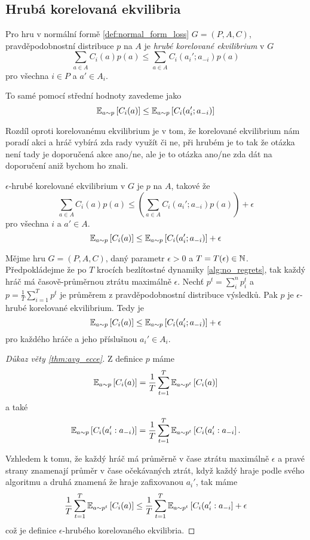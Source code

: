 \subsection{Hrubá korelovaná ekvilibria}
\begin{definition}
\label{def:cce}
Pro hru v normální formě \ref{def:normal_form_loss} $G= (P,A,C)$, pravděpodobnostní distribuce $p$ na $A$ je \textit{hrubé korelované ekvilibrium} v $G$ 
\[
    \sum_{a \in A} C_i(a)p(a) \leq \sum_{a \in A} C_i(a_i';a_{-i}) p(a)
\]
pro všechna $i \in P$ a $a'\in A_i$. 

To samé pomocí střední hodnoty zavedeme jako 
\[
    \E[a \sim p]{C_i(a)} \leq \E[a\sim p]{C_i(a_i';a_{-i})}
\]
\end{definition}
Rozdíl oproti korelovanému ekvilibrium je v tom, že korelované ekvilibrium nám poradí akci a hráč vybírá zda rady využít či ne, při hrubém je to tak že otázka není tady je doporučená akce ano/ne, ale je to otázka ano/ne zda dát na doporučení aniž bychom ho znali. 

\begin{definition}
\label{def:e_cce}
$\epsilon$-hrubé korelované ekvilibrium v $G$ je $p$ na $A$, takové že 
\[
    \sum_{a \in A} C_i(a)p(a) \leq \left( \sum_{a \in A} C_i(a_i';a_{-i}) p(a) \right) + \epsilon 
\]
pro všechna $i$ a $a' \in A$. 
\[
    \E[a \sim p]{C_i(a)} \leq \E[a\sim p]{C_i(a_i';a_{-i})} + \epsilon
\]
\end{definition}

\begin{theorem}\label{thm:avg_ecce}
Mějme hru $G=(P,A,C)$, daný parametr $\epsilon > 0$ a $T = T(\epsilon) \in \N$. Předpokládejme že po $T$ krocích bezlítostné dynamiky \ref{alg:no_regrets}, tak každý hráč má časově-průměrnou ztrátu maximálně $\epsilon$. 
Nechť $p^t =\sum_i^n p^t_i$ a $p = \frac{1}{T} \sum^T_{i=1} p^t$ je průměrem z pravděpodobnostní distribuce výsledků. Pak $p$ je $\epsilon$-hrubé korelované ekvilibrium. Tedy je  
\[
    \E[a \sim p]{C_i(a)} \leq \E[a\sim p]{C_i(a_i';a_{-i})} + \epsilon
\]
pro každého hráče a jeho příslušnou $a_i' \in A_i$.
\end{theorem}
\begin{proof}[Důkaz věty \ref{thm:avg_ecce}]
    Z definice $p$ máme 
    \[
        \E[a \sim p]{C_i(a)} = \frac{1}{T} \sum^T_{t=1} \E[a\sim p^t]{C_i(a)}
    \]
    a také
    \[
        \E[a \sim p]{C_i(a_i':a_{-i})} = \frac{1}{T} \sum^T_{t=1} \E[a\sim p^t]{C_i(a_i':a_{-i}}.
    \]

    Vzhledem k tomu, že každý hráč má průměrně v čase ztrátu maximálně $\epsilon$ a pravé strany znamenají průměr v čase očekávaných ztrát, když každý hraje podle svého algoritmu a druhá znamená že hraje zafixovanou $a_i'$, tak máme 
    \[
         \frac{1}{T} \sum^T_{t=1} \E[a\sim p^t]{C_i(a)} \leq \frac{1}{T} \sum^T_{t=1} \E[a\sim p^t]{C_i(a_i':a_{-i}} + \epsilon  
    \]
    což je definice $\epsilon$-hrubého korelovaného ekvilibria. 
\end{proof}
